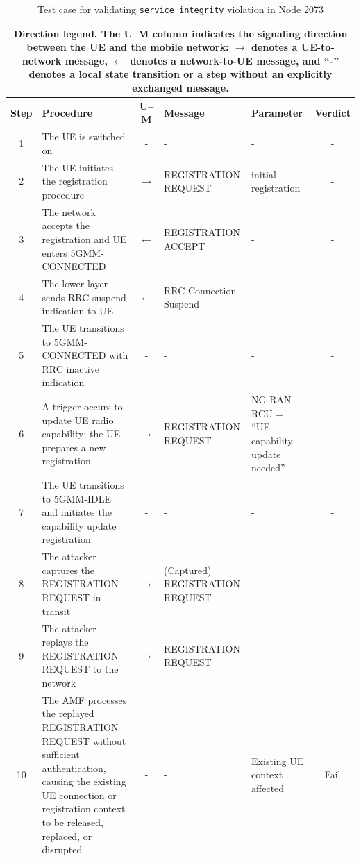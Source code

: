 \begin{table}[!t]
\scriptsize
\centering
\caption{Test case for validating \texttt{service integrity} violation in Node 2073}
\label{tab:replay-2073}
\vspace{-0.1in}
\setlength{\tabcolsep}{3pt}
\renewcommand{\arraystretch}{1.1}
\begin{tabular}{|c|p{7cm}|c|p{3.5cm}|p{3cm}|c|}
\hline
\multicolumn{6}{|p{0.96\textwidth}|}{
\textbf{Direction legend.} The U--M column indicates the signaling direction between the UE and the mobile network: $\rightarrow$ denotes a UE-to-network message, $\leftarrow$ denotes a network-to-UE message, and ``-'' denotes a local state transition or a step without an explicitly exchanged message.
} \\
\hline
\textbf{Step} & \textbf{Procedure} & \textbf{U--M} & \textbf{Message} & \textbf{Parameter} & \textbf{Verdict} \\
\hline
1 & The UE is switched on & - & - & - & - \\
\hline
2 & The UE initiates the registration procedure & $\rightarrow$ & REGISTRATION REQUEST & initial registration & - \\
\hline
3 & The network accepts the registration and UE enters 5GMM-CONNECTED & $\leftarrow$ & REGISTRATION ACCEPT & - & - \\
\hline
4 & The lower layer sends RRC suspend indication to UE & $\leftarrow$ & RRC Connection Suspend & - & - \\
\hline
5 & The UE transitions to 5GMM-CONNECTED with RRC inactive indication & - & - & - & - \\
\hline
6 & A trigger occurs to update UE radio capability; the UE prepares a new registration & $\rightarrow$ & REGISTRATION REQUEST & NG-RAN-RCU = ``UE capability update needed'' & - \\
\hline
7 & The UE transitions to 5GMM-IDLE and initiates the capability update registration & - & - & - & - \\
\hline
8 & The attacker captures the REGISTRATION REQUEST in transit & $\rightarrow$ & (Captured) REGISTRATION REQUEST & - & - \\
\hline
9 & The attacker replays the REGISTRATION REQUEST to the network & $\rightarrow$ & REGISTRATION REQUEST & - & - \\
\hline
10 & The AMF processes the replayed REGISTRATION REQUEST without sufficient authentication, causing the existing UE connection or registration context to be released, replaced, or disrupted & - & - & Existing UE context affected & Fail \\
\hline
\end{tabular}
\end{table}


